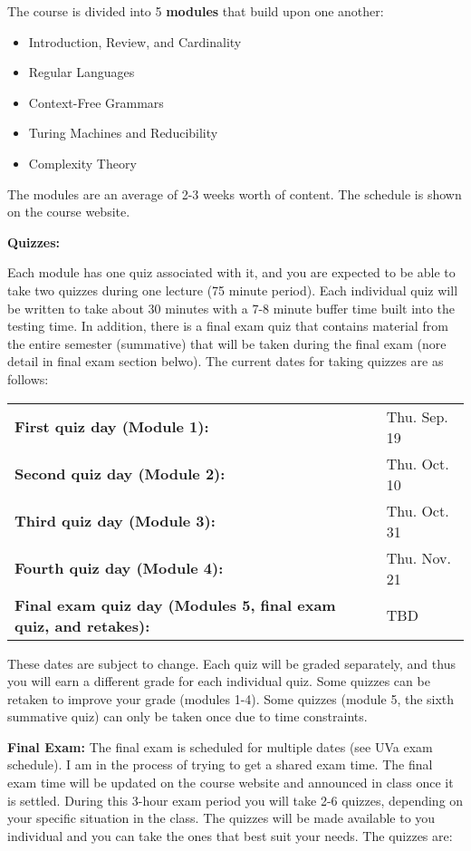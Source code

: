 \documentclass[12pt]{article}
\begin{document}
The course is divided into 5 {\bf modules} that build upon one another:
\begin{itemize}
    \item Introduction, Review, and Cardinality
    \item Regular Languages
    \item Context-Free Grammars
    \item Turing Machines and Reducibility
    \item Complexity Theory
\end{itemize}
The modules are an average of 2-3 weeks worth of content. The schedule is shown on the course website. 

\textbf{Quizzes:} 

Each module has one quiz associated with it, and you are expected to be able to take two quizzes during one lecture (75 minute period). Each individual quiz will be written to take about 30 minutes with a 7-8 minute buffer time built into the testing time. In addition, there is a final exam quiz that contains material from the entire semester (summative) that will be taken during the final exam (nore detail in final exam section belwo). The current dates for taking quizzes are as follows:

\begin{tabular}{ll}
\textbf{First quiz day (Module 1):} & Thu. Sep. 19 \\
\textbf{Second quiz day (Module 2):} & Thu. Oct. 10 \\
\textbf{Third quiz day (Module 3):} & Thu. Oct. 31 \\
\textbf{Fourth quiz day (Module 4):} & Thu. Nov. 21 \\
\textbf{Final exam quiz day (Modules 5, final exam quiz, and retakes):} & TBD \\
\end{tabular}

These dates are subject to change. Each quiz will be graded separately, and thus you will earn a different grade for each individual quiz. Some quizzes can be retaken to improve your grade (modules 1-4). Some quizzes (module 5, the sixth summative quiz) can only be taken once due to time constraints.

\textbf{Final Exam:} The final exam is scheduled for multiple dates (see UVa exam schedule). I am in the process of trying to get a shared exam time. The final exam time will be updated on the course website and announced in class once it is settled. During this 3-hour exam period you will take 2-6 quizzes, depending on your specific situation in the class. The quizzes will be made available to you individual and you can take the ones that best suit your needs. The quizzes are:
\end{document}
